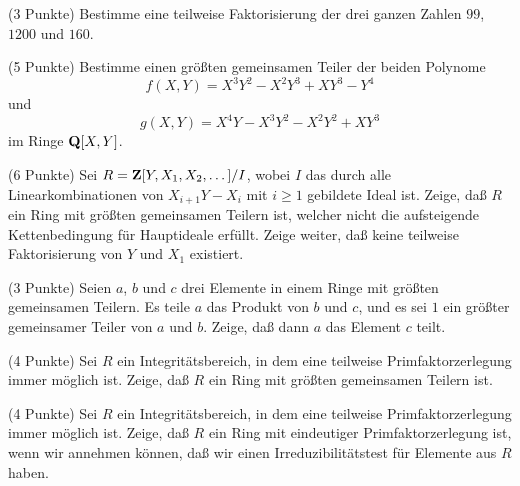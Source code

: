 \documentclass{algsheet}
\begin{document}
\begin{exercise}(3 Punkte)\newline
    Bestimme eine teilweise Faktorisierung der drei ganzen Zahlen
    \(99\), \(1200\) und \(160\).
\end{exercise}

\begin{exercise}(5 Punkte)\newline
    Bestimme einen größten gemeinsamen Teiler der beiden Polynome
    \begin{equation}
      f(X,Y) = X^3 Y^2 - X^2 Y^3 + X Y^3 - Y^4
    \end{equation}
    und
    \begin{equation}
      g(X,Y) = X^4 Y - X^3 Y^2 - X^2 Y^2 + X Y^3
    \end{equation}
    im Ringe \(\mathbf Q[X, Y]\). 
\end{exercise}

\begin{exercise}(6 Punkte)\newline
    Sei \(R = \mathbf Z[Y, X_1, X_2, \dotsc]/I\), wobei \(I\) das durch alle
    Linearkombinationen von \(X_{i + 1} Y - X_i\) mit \(i \ge 1\) gebildete 
    Ideal ist. Zeige, daß \(R\) ein Ring mit größten gemeinsamen Teilern ist,
    welcher nicht die aufsteigende Kettenbedingung für Hauptideale erfüllt.
    Zeige weiter, daß keine teilweise Faktorisierung von \(Y\) und \(X_1\)
    existiert.
\end{exercise}

\begin{exercise}(3 Punkte)\newline
  Seien \(a\), \(b\) und \(c\) drei Elemente in einem Ringe mit größten gemeinsamen
  Teilern. Es teile \(a\) das Produkt von \(b\) und \(c\), und es sei \(1\) ein
  größter gemeinsamer Teiler von \(a\) und \(b\). Zeige, daß dann \(a\) das Element
  \(c\) teilt.
\end{exercise}

\begin{exercise}(4 Punkte)\newline
  Sei \(R\) ein Integritätsbereich, in dem eine teilweise Primfaktorzerlegung
  immer möglich ist. Zeige, daß \(R\) ein Ring mit größten gemeinsamen Teilern ist.
\end{exercise}

\begin{exercise}(4 Punkte)\newline
  Sei \(R\) ein Integritätsbereich, in dem eine teilweise Primfaktorzerlegung
  immer möglich ist. Zeige, daß \(R\) ein Ring mit eindeutiger Primfaktorzerlegung
  ist, wenn wir annehmen können, daß wir einen Irreduzibilitätstest für 
  Elemente aus \(R\) haben.
\end{exercise}
\end{document}
